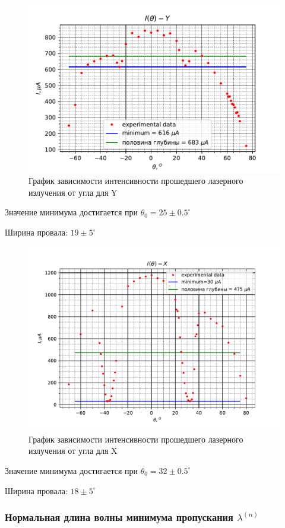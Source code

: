 \documentclass[a4paper, 12pt]{article}
\begin{document}
\begin{figure}[H]
	\centering
	\includegraphics[scale=0.75]{Y_green_2}
	\caption{График зависимости интенсивности прошедшего лазерного излучения от угла для Y}
	\label{im:8}
\end{figure}
Значение минимума достигается при $\theta_0 =25\pm 0.5^\circ  $

Ширина провала: $19\pm 5^\circ $
\begin{figure}[H]
	\centering
	\includegraphics[scale=0.6]{X_red_2}
	\caption{График зависимости интенсивности прошедшего лазерного излучения от угла для X}
	\label{im:9}
\end{figure}
Значение минимума достигается при $\theta_0 =32\pm 0.5^\circ $

Ширина провала: $18\pm 5^\circ $
\subsubsection{Нормальная длина волны минимума пропускания $\lambda^{(n)}$}
\end{document}
